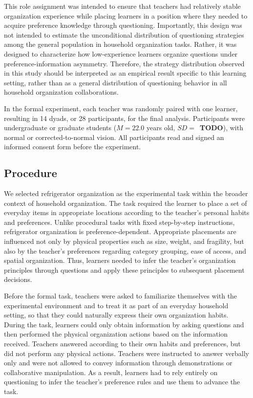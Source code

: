 \documentclass[manuscript,review,anonymous]{acmart}
\begin{document}
This role assignment was intended to ensure that teachers had relatively stable organization experience while placing learners in a position where they needed to acquire preference knowledge through questioning. Importantly, this design was not intended to estimate the unconditional distribution of questioning strategies among the general population in household organization tasks. Rather, it was designed to characterize how low-experience learners organize questions under preference-information asymmetry. Therefore, the strategy distribution observed in this study should be interpreted as an empirical result specific to this learning setting, rather than as a general distribution of questioning behavior in all household organization collaborations.

In the formal experiment, each teacher was randomly paired with one learner, resulting in 14 dyads, or 28 participants, for the final analysis. Participants were undergraduate or graduate students (\(M = 22.0\) years old, $SD = $~\textbf{TODO}), with normal or corrected-to-normal vision. All participants read and signed an informed consent form before the experiment.

\subsection{Procedure}
\label{sec:hhi-procedure}

We selected refrigerator organization as the experimental task within the broader context of household organization. The task required the learner to place a set of everyday items in appropriate locations according to the teacher's personal habits and preferences. Unlike procedural tasks with fixed step-by-step instructions, refrigerator organization is preference-dependent. Appropriate placements are influenced not only by physical properties such as size, weight, and fragility, but also by the teacher's preferences regarding category grouping, ease of access, and spatial organization. Thus, learners needed to infer the teacher's organization principles through questions and apply these principles to subsequent placement decisions.

Before the formal task, teachers were asked to familiarize themselves with the experimental environment and to treat it as part of an everyday household setting, so that they could naturally express their own organization habits. During the task, learners could only obtain information by asking questions and then performed the physical organization actions based on the information received. Teachers answered according to their own habits and preferences, but did not perform any physical actions. Teachers were instructed to answer verbally only and were not allowed to convey information through demonstrations or collaborative manipulation. As a result, learners had to rely entirely on questioning to infer the teacher's preference rules and use them to advance the task.
\end{document}
